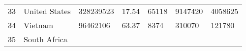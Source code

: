 \documentclass[
]{article}
\begin{document}
\begin{longtable}[]{@{}lllllll@{}}
\begin{minipage}[t]{0.06\columnwidth}\raggedright
33\strut
\end{minipage} & \begin{minipage}[t]{0.15\columnwidth}\raggedright
United States\strut
\end{minipage} & \begin{minipage}[t]{0.13\columnwidth}\raggedright
328239523\strut
\end{minipage} & \begin{minipage}[t]{0.13\columnwidth}\raggedright
17.54\strut
\end{minipage} & \begin{minipage}[t]{0.09\columnwidth}\raggedright
65118\strut
\end{minipage} & \begin{minipage}[t]{0.12\columnwidth}\raggedright
9147420\strut
\end{minipage} & \begin{minipage}[t]{0.12\columnwidth}\raggedright
4058625\strut
\end{minipage}\tabularnewline
\begin{minipage}[t]{0.06\columnwidth}\raggedright
34\strut
\end{minipage} & \begin{minipage}[t]{0.15\columnwidth}\raggedright
Vietnam\strut
\end{minipage} & \begin{minipage}[t]{0.13\columnwidth}\raggedright
96462106\strut
\end{minipage} & \begin{minipage}[t]{0.13\columnwidth}\raggedright
63.37\strut
\end{minipage} & \begin{minipage}[t]{0.09\columnwidth}\raggedright
8374\strut
\end{minipage} & \begin{minipage}[t]{0.12\columnwidth}\raggedright
310070\strut
\end{minipage} & \begin{minipage}[t]{0.12\columnwidth}\raggedright
121780\strut
\end{minipage}\tabularnewline
\begin{minipage}[t]{0.06\columnwidth}\raggedright
35\strut
\end{minipage} & \begin{minipage}[t]{0.15\columnwidth}\raggedright
South Africa\strut
\end{minipage} & \begin{minipage}[t]{0.13\columnwidth}\raggedright

\end{minipage}
\end{longtable}
\end{document}
